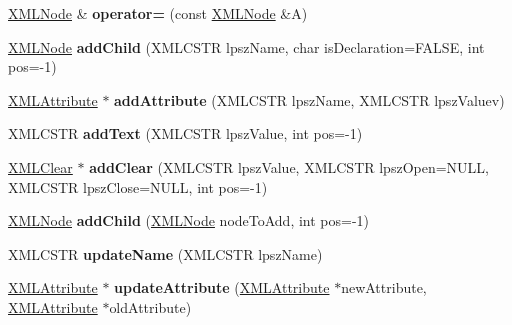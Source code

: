\begin{DoxyCompactItemize}
\item 
\hyperlink{struct_x_m_l_node}{X\+M\+L\+Node} \& {\bfseries operator=} (const \hyperlink{struct_x_m_l_node}{X\+M\+L\+Node} \&A)\hypertarget{struct_x_m_l_node_ac7201d06ce47509423dd7cc937e69cf8}{}\label{struct_x_m_l_node_ac7201d06ce47509423dd7cc937e69cf8}

\item 
\hyperlink{struct_x_m_l_node}{X\+M\+L\+Node} {\bfseries add\+Child} (X\+M\+L\+C\+S\+TR lpsz\+Name, char is\+Declaration=F\+A\+L\+SE, int pos=-\/1)\hypertarget{struct_x_m_l_node_a71645ec6bcd94ff4bff62810377954ce}{}\label{struct_x_m_l_node_a71645ec6bcd94ff4bff62810377954ce}

\item 
\hyperlink{struct_x_m_l_attribute}{X\+M\+L\+Attribute} $\ast$ {\bfseries add\+Attribute} (X\+M\+L\+C\+S\+TR lpsz\+Name, X\+M\+L\+C\+S\+TR lpsz\+Valuev)\hypertarget{struct_x_m_l_node_a7938c43648ce7ed32efc9f0a5e3b5d2c}{}\label{struct_x_m_l_node_a7938c43648ce7ed32efc9f0a5e3b5d2c}

\item 
X\+M\+L\+C\+S\+TR {\bfseries add\+Text} (X\+M\+L\+C\+S\+TR lpsz\+Value, int pos=-\/1)\hypertarget{struct_x_m_l_node_aa4210523be86adbfb39ad52469a9a072}{}\label{struct_x_m_l_node_aa4210523be86adbfb39ad52469a9a072}

\item 
\hyperlink{struct_x_m_l_clear}{X\+M\+L\+Clear} $\ast$ {\bfseries add\+Clear} (X\+M\+L\+C\+S\+TR lpsz\+Value, X\+M\+L\+C\+S\+TR lpsz\+Open=N\+U\+LL, X\+M\+L\+C\+S\+TR lpsz\+Close=N\+U\+LL, int pos=-\/1)\hypertarget{struct_x_m_l_node_ad98c759ea686cd8b30314259f942aabf}{}\label{struct_x_m_l_node_ad98c759ea686cd8b30314259f942aabf}

\item 
\hyperlink{struct_x_m_l_node}{X\+M\+L\+Node} {\bfseries add\+Child} (\hyperlink{struct_x_m_l_node}{X\+M\+L\+Node} node\+To\+Add, int pos=-\/1)\hypertarget{struct_x_m_l_node_adcb76cce8d914425b03fdd9a06ee2a47}{}\label{struct_x_m_l_node_adcb76cce8d914425b03fdd9a06ee2a47}

\item 
X\+M\+L\+C\+S\+TR {\bfseries update\+Name} (X\+M\+L\+C\+S\+TR lpsz\+Name)\hypertarget{struct_x_m_l_node_ae08b643a2b87a77bad3c70eb57ea3043}{}\label{struct_x_m_l_node_ae08b643a2b87a77bad3c70eb57ea3043}

\item 
\hyperlink{struct_x_m_l_attribute}{X\+M\+L\+Attribute} $\ast$ {\bfseries update\+Attribute} (\hyperlink{struct_x_m_l_attribute}{X\+M\+L\+Attribute} $\ast$new\+Attribute, \hyperlink{struct_x_m_l_attribute}{X\+M\+L\+Attribute} $\ast$old\+Attribute)\hypertarget{struct_x_m_l_node_adfbd017929a40d6584350e7f3652fcbd}{}\label{struct_x_m_l_node_adfbd017929a40d6584350e7f3652fcbd}


\end{DoxyCompactItemize}
